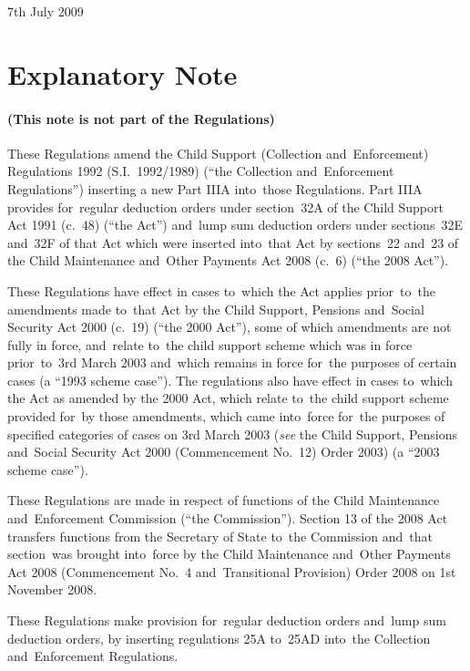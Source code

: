 \documentclass[12pt,a4paper]{article}
\begin{document}
7th July 2009

\small

\part{Explanatory Note}

\renewcommand\parthead{— Explanatory Note}

\subsection*{(This note is not part of the Regulations)}

These Regulations amend the Child Support (Collection and~Enforcement) Regulations 1992 (S.I.~1992/1989) (“the Collection and~Enforcement Regulations”) inserting a new Part IIIA into~those Regulations. Part IIIA provides for~regular deduction orders under section~32A of the Child Support Act 1991 (c.~48) (“the Act”) and~lump sum deduction orders under sections~32E and~32F of that Act which were inserted into~that Act by sections~22 and~23 of the Child Maintenance and~Other Payments Act 2008 (c.~6) (“the 2008 Act”).

These Regulations have effect in cases to~which the Act applies prior~to~the amendments made to~that Act by the Child Support, Pensions and~Social Security Act 2000 (c.~19) (“the 2000 Act”), some of which amendments are not fully in force, and~relate to~the child support scheme which was in force prior~to~3rd March 2003 and~which remains in force for~the purposes of certain cases (a “1993 scheme case”). The regulations also have effect in cases to~which the Act as amended by the 2000 Act, which relate to~the child support scheme provided for~by those amendments, which came into~force for~the purposes of specified categories of cases on 3rd March 2003 (\emph{see} the Child Support, Pensions and~Social Security Act 2000 (Commencement No.~12) Order 2003) (a “2003 scheme case”).

These Regulations are made in respect of functions of the Child Maintenance and~Enforcement Commission (“the Commission”). Section 13 of the 2008 Act transfers functions from the Secretary of State to~the Commission and~that section~was brought into~force by the Child Maintenance and~Other Payments Act 2008 (Commencement No.~4 and~Transitional Provision) Order 2008 on 1st November 2008.

These Regulations make provision for~regular deduction orders and~lump sum deduction orders, by inserting regulations 25A to~25AD into~the Collection and~Enforcement Regulations.
\end{document}
